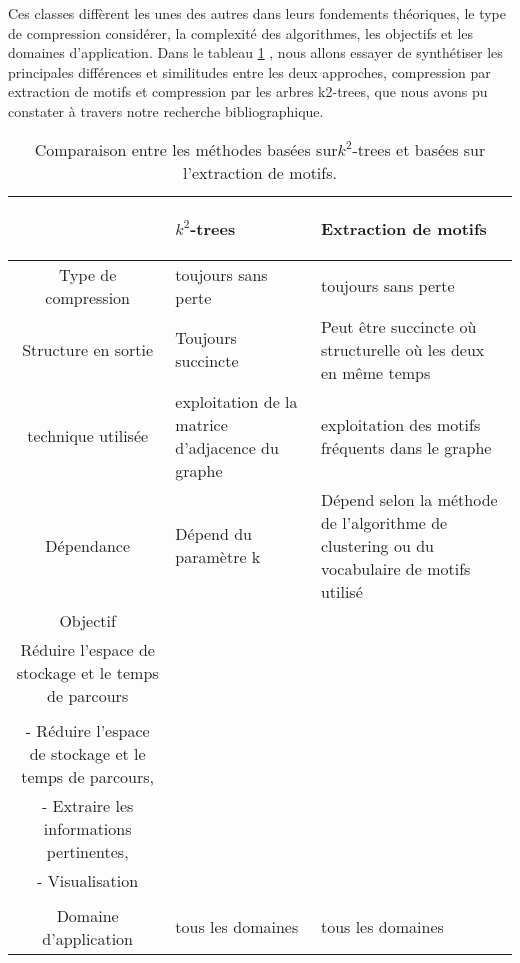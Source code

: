  Ces classes diffèrent les unes des autres dans leurs fondements théoriques, le type de compression considérer, la complexité des algorithmes, les objectifs et les domaines d'application. 
 Dans le tableau \ref{comgen} , nous allons essayer de synthétiser les principales différences et similitudes entre les deux approches, compression par extraction de motifs et compression par les arbres k2-trees, que nous avons pu constater à travers notre recherche bibliographique. 
\begin{table}
\begin{tabular}{|c|p{5cm}|p{6cm}|}

\hline & \begin{center}
\textbf{$k^2$-trees}
\end{center}     &  \begin{center} \textbf{Extraction de motifs} \end{center}  \\
										
										
\hline Type de compression & toujours sans perte & toujours sans perte \\
\hline Structure en sortie & Toujours succincte & Peut être succincte où structurelle où les deux en même temps\\

\hline technique utilisée & exploitation de la matrice d'adjacence du graphe & exploitation des motifs fréquents dans le graphe\\

\hline Dépendance & Dépend du paramètre k & Dépend selon la méthode de l'algorithme de clustering ou du vocabulaire de motifs utilisé  \\

\hline Objectif & 
\begin{minipage}[t]{0.35\textwidth}
  			Compression,\\
  			Réduire l'espace de stockage et le temps de parcours\\
  \end{minipage}
  &
  \begin{minipage}[t]{0.25\textwidth}
  			- Compression,\\
  			- Réduire l'espace de  stockage et le temps de parcours,\\
  			- Extraire les informations pertinentes, \\
  			- Visualisation \\
  \end{minipage}
  \\
  \hline Domaine d'application & tous les domaines & tous les domaines \\
  \hline
\end{tabular}
									\caption{Comparaison entre les méthodes basées sur$k^2$-trees et basées sur l'extraction de motifs.}									\label{comgen}
									
								\end{table}
								

